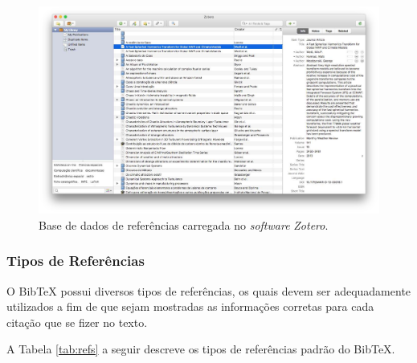 \begin{figure}[H]
\caption{Base de dados de referências carregada no \textit{software} \textit{Zotero}.}
\vspace{6mm}
    \begin{center}
        \includegraphics[scale=0.3]{./docs/figs/zotero.pdf}
    \end{center}
\vspace{4mm}
\label{fig:exe_zotero}
\end{figure}

\subsubsection*{Tipos de Referências}
\label{sec:estilos_refs}

O Bib\TeX{} possui diversos tipos de referências, os quais devem ser adequadamente utilizados a fim de que sejam mostradas as informações corretas para cada citação que se fizer no texto.

A Tabela \ref{tab:refs} a seguir descreve os tipos de referências padrão do Bib\TeX{}.

